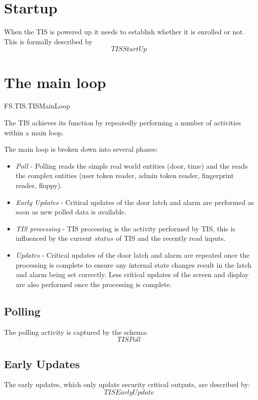 \section{Startup}


When the TIS is powered up it needs to establish whether it is
enrolled or not. This is formally described by
\[
        TISStartUp
\]

\section{The main loop}


\begin{traceunit}{FS.TIS.TISMainLoop}
\end{traceunit}



The TIS achieves its function by repeatedly performing a number of 
activities within a main loop.

The main loop is broken down into several phases:

\begin{itemize}
\item   
{\em Poll} - Polling reads the simple real world entities
(door, time)
and the reads the complex entities
(user token reader, admin token reader, fingerprint reader, floppy).
\item
{\em Early Updates} - Critical updates of the door latch and alarm are
performed as soon as new polled data is available.
\item
{\em TIS processing} - TIS processing is the activity performed by
TIS, this is influenced by the current $status$ of TIS and the
recently read inputs.
\item
{\em Updates} - Critical updates of the door latch and alarm are
repeated once the processing is complete to ensure any internal state
changes result in the latch and alarm being set correctly. Less critical updates of the screen and display
are also performed once the processing is complete.
\end{itemize}

\subsection{Polling}

The polling activity is captured by the schema:
\[
TISPoll
\]
\subsection{Early Updates}
The early updates, which only update security critical outputs, are
described by:
\[
TISEarlyUpdate
\]
